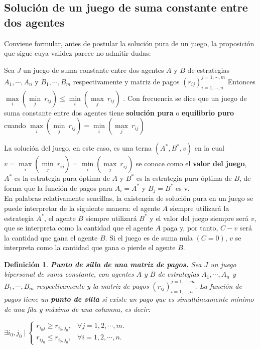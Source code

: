 \subsection{Solución de un juego de suma constante entre dos agentes}
Conviene formular, antes de postular  la solución pura de un juego, la proposición que sigue cuya validez parece no admitir dudas:
\begin{proposicion}
Sea $J$ un juego de suma constante entre dos agentes $A$ y $B$ de estrategias $A_1, \cdots, A_n$ y $B_1, \cdots, B_m$  respectivamente y matriz de pagos $\left(r_{ij}\right)_{i=1, \cdots ,n}^{j=1, \cdots, m} $ Entonces $\underset{i}{\max}\left( \underset{j}{\min} \: r_{ij} \right) \leq \underset{i}{\min}\left( \underset{j}{\max} \: r_{ij} \right)$ .  Con frecuencia se dice que un juego de suma constante entre dos agentes tiene \textbf{solución pura} o \textbf{equilibrio puro} cuando  $\underset{i}{\max}\left( \underset{j}{\min} \: r_{ij} \right) = \underset{i}{\min}\left( \underset{j}{\max} \: r_{ij} \right)$
\end{proposicion}

La solución del juego, en este caso, es una terna $\left( A^*,B^*,v \right)$ en la cual $v = \underset{i}{\max}\left( \underset{j}{\min} \: r_{ij} \right) = \underset{i}{\min}\left( \underset{j}{\max} \: r_{ij} \right)$ se conoce como el \textbf{valor del juego}, $A^*$ es la estrategia pura óptima de $A$ y $B^*$ es la estrategia pura óptima de $B$, de forma que la función de pagos para $A_i = A^*$ y $B_j=B^*$ es v.
\\
En palabras relativamente sencillas, la existencia de solución pura en un juego se puede interpretar de la siguiente manera: el agente $A$ siempre utilizará la estrategia $A^*$, el agente $B$ siempre utilizará $B^*$ y el valor del juego siempre será $v$, que se interpreta como la cantidad  que el agente $A$ paga y, por tanto, $C-v$ será la cantidad que gana el agente $B$. Si el juego es de suma nula $(C=0)$, $v$ se interpreta como la cantidad que gana o pierde el agente $B$.

\newtheorem{definicion}{Definición}
\begin{definicion}\label{Def:Pto_silla_mp}
\textbf{Punto de silla de una matriz de pagos.}
Sea $J$ un juego bipersonal de suma constante, con agentes $A$ y  $B$ de estrategias $A_1, \cdots, A_n$ y $B_1, \cdots, B_m$ respectivamente y la matriz de pagos $\left( r_{ij}\right)_{i=1, \cdots ,n}^{j=1, \cdots, m}$.  La función de pagos tiene un \textbf{punto de silla} si existe un pago que es simultáneamente mínimo de una fila y máximo de una columna, es decir:

\begin{center}
    $\exists i_0,j_0 \: | \: \begin{cases}
    r_{i_0j} \geq r_{i_0,j_0}, & \forall j = 1,2,\cdots,m.\\
    r_{ij_0} \leq r_{i_0,j_0}, & \forall i = 1,2,\cdots,n.
  \end{cases}$
\end{center}
\end{definicion}


